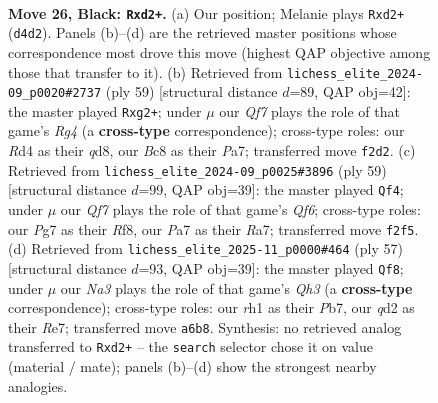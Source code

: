\documentclass[11pt]{article}
\begin{document}
\clearpage

\begin{figure}[p]\centering
\begin{subfigure}{0.46\textwidth}\centering
\resizebox{\linewidth}{!}{%
\newchessgame
\chessboard[
  setfen={r1b2k2/pp3pp1/n3p3/3p4/3r4/PP6/2KQ1qPP/R5NR b - - 3 26},
  showmover=false,
  pgfstyle=straightmove, color=movearrow, markmove={d4-d2}
]}
\caption{}
\end{subfigure}\hfill
\begin{subfigure}{0.46\textwidth}\centering
\resizebox{\linewidth}{!}{%
\newchessgame
\chessboard[
  setfen={3Q4/p3rqpk/4p2p/4P1r1/2PN4/2P5/6RP/3R2K1 b - - 0 30},
  showmover=false,
  pgfstyle=straightmove, color=movearrow, markmove={g5-g2}
]}
\caption{}
\end{subfigure}
\\[4pt]
\begin{subfigure}{0.46\textwidth}\centering
\resizebox{\linewidth}{!}{%
\newchessgame
\chessboard[
  setfen={5rk1/r4p2/2Bp2p1/p3p2p/4P1n1/2P2qN1/PP4Q1/4R1K1 b - - 3 30},
  showmover=false,
  pgfstyle=straightmove, color=movearrow, markmove={f3-f4}
]}
\caption{}
\end{subfigure}\hfill
\begin{subfigure}{0.46\textwidth}\centering
\resizebox{\linewidth}{!}{%
\newchessgame
\chessboard[
  setfen={6k1/1p2rp1p/p1pQP1pq/3n4/8/6N1/PP3PP1/4R1K1 b - - 0 29},
  showmover=false,
  pgfstyle=straightmove, color=movearrow, markmove={h6-f8}
]}
\caption{}
\end{subfigure}
\caption{\textbf{Move 26, Black: \texttt{Rxd2+}.} (a) Our position; Melanie plays \texttt{Rxd2+} (\texttt{d4d2}). Panels (b)--(d) are the retrieved master positions whose correspondence most drove this move (highest QAP objective among those that transfer to it). (b) Retrieved from \texttt{lichess\_elite\_2024-09\_p0020\#2737} (ply 59) [structural distance $d$=89, QAP obj=42]: the master played \texttt{Rxg2+}; under $\mu$ our \emph{Qf7} plays the role of that game's \emph{Rg4} (a \textbf{cross-type} correspondence); cross-type roles: our \emph{R}d4 as their \emph{q}d8, our \emph{B}c8 as their \emph{P}a7; transferred move \texttt{f2d2}. (c) Retrieved from \texttt{lichess\_elite\_2024-09\_p0025\#3896} (ply 59) [structural distance $d$=99, QAP obj=39]: the master played \texttt{Qf4}; under $\mu$ our \emph{Qf7} plays the role of that game's \emph{Qf6}; cross-type roles: our \emph{P}g7 as their \emph{R}f8, our \emph{P}a7 as their \emph{R}a7; transferred move \texttt{f2f5}. (d) Retrieved from \texttt{lichess\_elite\_2025-11\_p0000\#464} (ply 57) [structural distance $d$=93, QAP obj=39]: the master played \texttt{Qf8}; under $\mu$ our \emph{Na3} plays the role of that game's \emph{Qh3} (a \textbf{cross-type} correspondence); cross-type roles: our \emph{r}h1 as their \emph{P}b7, our \emph{q}d2 as their \emph{R}e7; transferred move \texttt{a6b8}. Synthesis: no retrieved analog transferred to \texttt{Rxd2+} -- the \texttt{search} selector chose it on value (material / mate); panels (b)--(d) show the strongest nearby analogies.}
\label{fig:thought-m51}
\end{figure}
\end{document}
